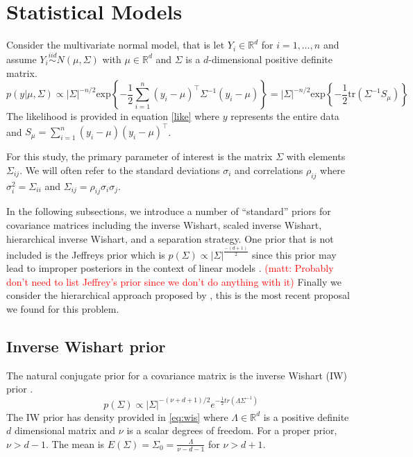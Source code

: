 \documentclass[a4paper]{article}
\newcommand{\matt}[1]{\textcolor{red}{(matt: #1)}}
\begin{document}
\section{Statistical Models}

Consider the multivariate normal model, that is let $Y_i\in \mathbb{R}^d$ for $i=1,\ldots,n$ and assume $Y_i \stackrel{iid}{\sim} N(\mu, \Sigma)$ with $\mu\in \mathbb{R}^d$ and $\Sigma$ is a $d$-dimensional positive definite matrix.   
  \begin{equation}
 p(y\vert \mu,\Sigma) \propto |\Sigma|^{-n/2} \mbox{exp}\left\{- \frac{1}{2} \sum_{i=1}^n (y_i-\mu)^\top \Sigma^{-1} (y_i-\mu) \right\} = |\Sigma|^{-n/2}  \mbox{exp}\left\{- \frac{1}{2}  \mbox{tr}(\Sigma^{-1}S_\mu)  \right\} 
 \label{like}
 \end{equation}
The likelihood is provided in equation \eqref{like} where $y$ represents the entire data and  $S_\mu = \sum_{i=1}^n (y_i-\mu) (y_i-\mu) ^\top$. 


For this study, the primary parameter of interest is the matrix $\Sigma$ with elements $\Sigma_{ij}$. We will often refer to the standard deviations $\sigma_i$ and correlations $\rho_{ij}$ where $\sigma_i^2 = \Sigma_{ii}$ and $\Sigma_{ij} = \rho_{ij}\sigma_i\sigma_j$. 

In the following subsections, we introduce a number of ``standard'' priors for covariance matrices including the inverse Wishart, scaled inverse Wishart, hierarchical inverse Wishart, and a separation strategy. One prior that is not included is the Jeffreys prior which is $p(\Sigma)\propto |\Sigma| ^ {\frac{-(d+1)}{2} } $ since this prior may lead to improper posteriors in the context of linear models \citep{gelman2006prior, SIW2008}. \matt{Probably don't need to list Jeffrey's prior since we don't do anything with it} Finally we consider the hierarchical approach proposed by \cite{huang2013simple}, this is the most recent proposal we found for this problem. 

\subsection{Inverse Wishart prior}

The natural conjugate prior for a covariance matrix is the inverse Wishart (IW) prior \citep{barnard2000}. 
\begin{equation} 
p(\Sigma) \propto  |\Sigma|^{-(\nu+ d +1)/2 } e^{-\frac{1}{2} tr( \Lambda \Sigma^{-1}) }
\label{eq:wis}
\end{equation}
The IW prior has density provided in \eqref{eq:wis} where $\Lambda\in \mathbb{R}^d$ is a positive definite $d$ dimensional matrix and $\nu$ is a scalar degrees of freedom. For a proper prior, $\nu>d-1$. The mean is $E(\Sigma) = \Sigma_0= \frac{\Lambda}{\nu - d - 1}$ for $\nu>d+1$. 
\end{document}
